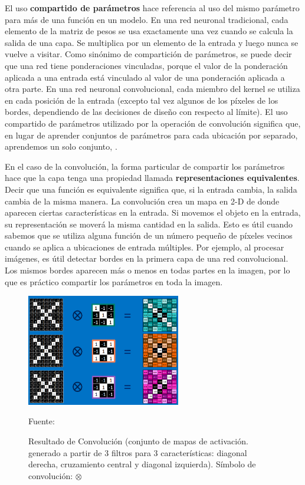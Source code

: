 		
		El uso {\bf compartido de parámetros} hace referencia al uso del mismo parámetro para más de una función en un modelo. En una red neuronal tradicional, cada elemento de la matriz de pesos se usa exactamente una vez cuando se calcula la salida de una capa. Se multiplica por un elemento de la entrada y luego nunca se vuelve a visitar. Como sinónimo de compartición de parámetros, se puede decir que una red tiene ponderaciones vinculadas, porque el valor de la ponderación aplicada a una entrada está vinculado al valor de una ponderación aplicada a otra parte. En una red neuronal convolucional, cada miembro del kernel se utiliza en cada posición de la entrada (excepto tal vez algunos de los píxeles de los bordes, dependiendo de las decisiones de diseño con respecto al límite). El uso compartido de parámetros utilizado por la operación de convolución significa que, en lugar de aprender conjuntos de parámetros para cada ubicación por separado, aprendemos un solo conjunto, \citep{Goodfellow-et-al-2016}.
		\vskip 0.4cm  

		En el caso de la convolución, la forma particular de compartir los parámetros hace que la capa tenga una propiedad llamada {\bf representaciones equivalentes}. Decir que una función es equivalente significa que, si la entrada cambia, la salida cambia de la misma manera.
		La convolución crea un mapa en 2-D de donde aparecen ciertas características en la entrada. Si movemos el objeto en la entrada, su representación se moverá la misma cantidad en la salida. Esto es útil cuando sabemos que se utiliza alguna función de un número pequeño de píxeles vecinos cuando se aplica a ubicaciones de entrada múltiples. Por ejemplo, al procesar imágenes, es útil detectar bordes en la primera capa de una red convolucional. Los mismos bordes aparecen más o menos en todas partes en la imagen, por lo que es práctico compartir los parámetros en toda la imagen.

		\begin{figure}[H]
		\begin{center}
		\includegraphics[width=0.6\textwidth]{images/marcoteorico/result_conv}
		\end{center}
		\begin{center}
		\vskip 0.1cm  
		\caption{\small{Resultado de Convolución (conjunto de mapas de activación. generado a partir de 3 filtros para 3 características: diagonal derecha, cruzamiento central y diagonal izquierda). Símbolo de convolución: $\otimes$}}
		\vskip -0.1cm  
		{\small{Fuente: \cite{Rohrer}}}
		\end{center}
		\vspace{-1.9em}
		\end{figure}

